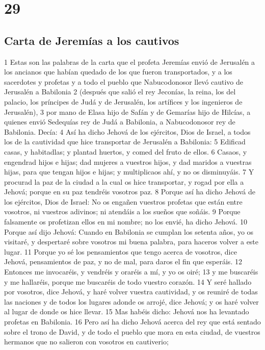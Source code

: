 \chapter{29}

\section*{Carta de Jeremías a los cautivos}

1 Estas son las palabras de la carta que el profeta Jeremías envió de Jerusalén a los ancianos que habían quedado de los que fueron transportados, y a los sacerdotes y profetas y a todo el pueblo que Nabucodonosor llevó cautivo de Jerusalén a Babilonia
2 (después que salió el rey Jeconías, la reina, los del palacio, los príncipes de Judá y de Jerusalén, los artífices y los ingenieros de Jerusalén), 
3 por mano de Elasa hijo de Safán y de Gemarías hijo de Hilcías, a quienes envió Sedequías rey de Judá a Babilonia, a Nabucodonosor rey de Babilonia. Decía:
4 Así ha dicho Jehová de los ejércitos, Dios de Israel, a todos los de la cautividad que hice transportar de Jerusalén a Babilonia:
5 Edificad casas, y habitadlas; y plantad huertos, y comed del fruto de ellos.
6 Casaos, y engendrad hijos e hijas; dad mujeres a vuestros hijos, y dad maridos a vuestras hijas, para que tengan hijos e hijas; y multiplicaos ahí, y no os disminuyáis.
7 Y procurad la paz de la ciudad a la cual os hice transportar, y rogad por ella a Jehová; porque en su paz tendréis vosotros paz.
8 Porque así ha dicho Jehová de los ejércitos, Dios de Israel: No os engañen vuestros profetas que están entre vosotros, ni vuestros adivinos; ni atendáis a los sueños que soñáis.
9 Porque falsamente os profetizan ellos en mi nombre; no los envié, ha dicho Jehová.
10 Porque así dijo Jehová: Cuando en Babilonia se cumplan los setenta años, yo os visitaré, y despertaré sobre vosotros mi buena palabra, para haceros volver a este lugar.
11 Porque yo sé los pensamientos que tengo acerca de vosotros, dice Jehová, pensamientos de paz, y no de mal, para daros el fin que esperáis.
12 Entonces me invocaréis, y vendréis y oraréis a mí, y yo os oiré;
13 y me buscaréis y me hallaréis, porque me buscaréis de todo vuestro corazón. 
14 Y seré hallado por vosotros, dice Jehová, y haré volver vuestra cautividad, y os reuniré de todas las naciones y de todos los lugares adonde os arrojé, dice Jehová; y os haré volver al lugar de donde os hice llevar.
15 Mas habéis dicho: Jehová nos ha levantado profetas en Babilonia.
16 Pero así ha dicho Jehová acerca del rey que está sentado sobre el trono de David, y de todo el pueblo que mora en esta ciudad, de vuestros hermanos que no salieron con vosotros en cautiverio;
